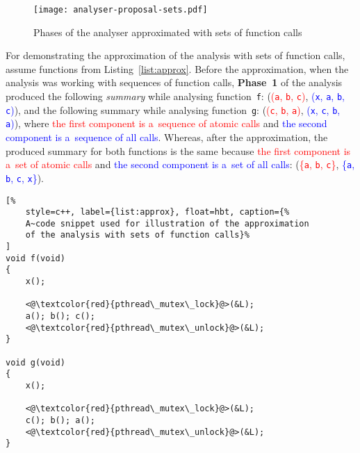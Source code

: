 \begin{figure}[hbt]
    \centering
    \texttt{[image: analyser-proposal-sets.pdf]}
    \caption{Phases of the analyser approximated with sets of function calls}
    \label{fig:atomerProposalSets}
\end{figure}

\begin{example}
    For demonstrating the approximation of the analysis with sets of
    function calls, assume functions from Listing~\ref{list:approx}.
    Before the approximation, when the analysis was working with sequences
    of function calls, \textbf{Phase~1} of the analysis produced the
    following \emph{summary} while analysing function~\texttt{f}:
    (\textcolor{red}{(\texttt{a}, \texttt{b}, \texttt{c})}, \textcolor{blue}{%
    (\texttt{x}, \texttt{a}, \texttt{b}, \texttt{c})}), and the following
    summary while analysing function~\texttt{g}:
    (\textcolor{red}{(\texttt{c}, \texttt{b}, \texttt{a})}, \textcolor{blue}{%
    (\texttt{x}, \texttt{c}, \texttt{b}, \texttt{a})}), where
    \textcolor{red}{the first component is a~sequence of atomic calls}
    and \textcolor{blue}{the second component is a~sequence of all calls}.
    Whereas, after the approximation, the produced summary for both
    functions is the same because \textcolor{red}{the first component is
    a~set of atomic calls} and \textcolor{blue}{the second component is
    a~set of all calls}: (\textcolor{red}{\{\texttt{a}, \texttt{b},
    \texttt{c}\}}, \textcolor{blue}{\{\texttt{a}, \texttt{b}, \texttt{c},
    \texttt{x}\}}).
\end{example}

\begin{lstlisting}[%
    style=c++, label={list:approx}, float=hbt, caption={%
    A~code snippet used for illustration of the approximation
    of the analysis with sets of function calls}%
]
void f(void)
{
    x();

    <@\textcolor{red}{pthread\_mutex\_lock}@>(&L);
    a(); b(); c();
    <@\textcolor{red}{pthread\_mutex\_unlock}@>(&L);
}

void g(void)
{
    x();

    <@\textcolor{red}{pthread\_mutex\_lock}@>(&L);
    c(); b(); a();
    <@\textcolor{red}{pthread\_mutex\_unlock}@>(&L);
}
\end{lstlisting}

